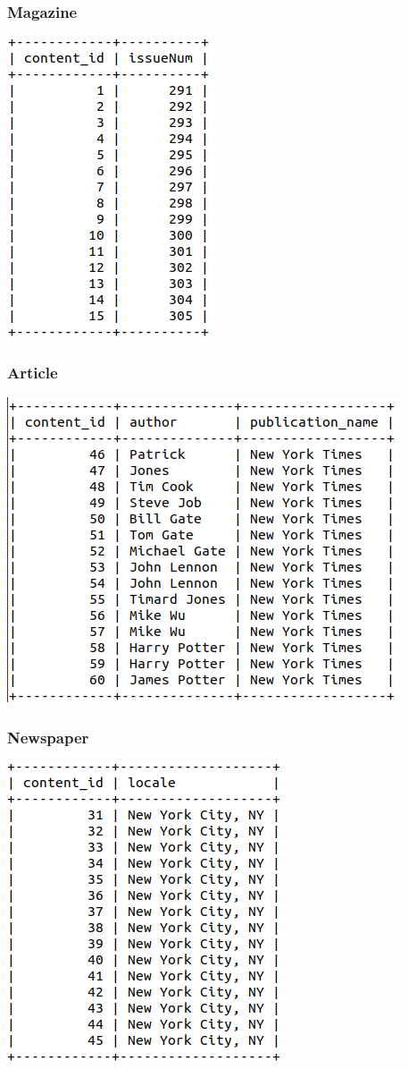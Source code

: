 \documentclass[letter, 12pt, titlepage]{article}
\begin{document}
\subsubsection{Magazine}
\includegraphics[scale=.5]{magazine.png}
\subsubsection{Article}
\includegraphics[scale=.5]{article.png}
\subsubsection{Newspaper}
\includegraphics[scale=.5]{newspaper.png}
\end{document}
